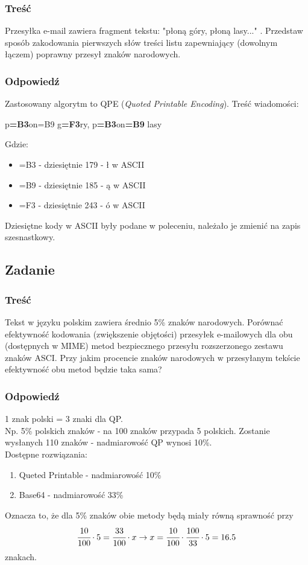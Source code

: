 		\subsubsection{Treść}
			Przesyłka e-mail zawiera fragment tekstu: "płoną góry, płoną lasy..." . Przedstaw sposób zakodowania pierwszych słów treści listu zapewniający (dowolnym łączem) poprawny przesył znaków narodowych.
		\subsubsection{Odpowiedź}
			Zastosowany algorytm to QPE (\emph{Quoted Printable Encoding}). Treść wiadomości:
			\begin{center}
				p\textbf{=B3}on=B9 g\textbf{=F3}ry, p\textbf{=B3}on\textbf{=B9} lasy
			\end{center}
			Gdzie:
			\begin{itemize}
				\item =B3 - dziesiętnie 179 - ł w ASCII
				\item =B9 - dziesiętnie 185 - ą w ASCII
				\item =F3 - dziesiętnie 243 - ó w ASCII
			\end{itemize}
			Dziesiętne kody w ASCII były podane w poleceniu, należało je zmienić na zapis szesnastkowy.	
\newpage
	\subsection{Zadanie}
		\subsubsection{Treść}
			Tekst w języku polskim zawiera średnio 5\% znaków narodowych. Porównać efektywność kodowania (zwiększenie objętości) przesyłek e-mailowych dla obu (dostępnych w MIME) metod bezpiecznego przesyłu rozszerzonego zestawu znaków ASCI. Przy jakim procencie znaków narodowych w przesyłanym tekście efektywność obu metod będzie taka sama?
		\subsubsection{Odpowiedź}
			1 znak polski = 3 znaki dla QP.\\
			Np. 5\% polskich znaków - na 100 znaków przypada 5 polskich. Zostanie wysłanych 110 znaków - nadmiarowość QP wynosi 10\%.\\
			Dostępne rozwiązania:
			\begin{enumerate}
				\item Queted Printable - nadmiarowość 10\%
				\item Base64 - nadmiarowość 33\%
			\end{enumerate}
			Oznacza to, że dla 5\% znaków obie metody będą miały równą sprawność przy
			$$ \cfrac{10}{100}\cdot5=\cfrac{33}{100}\cdot x \rightarrow x = \cfrac{10}{100}\cdot\cfrac{100}{33}\cdot 5 = 16.5 $$
			znakach.
			
